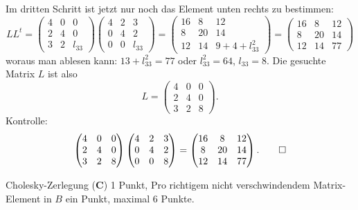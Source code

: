 \begin{loesung}
Im dritten Schritt ist jetzt nur noch das Element unten rechts zu bestimmen:
\[
LL^t=
\begin{pmatrix}
4&0&     0\\
2&4&     0\\
3&2&l_{33}
\end{pmatrix}
\begin{pmatrix}
4&2&     3\\
0&4&     2\\
0&0&l_{33}
\end{pmatrix}
=
\begin{pmatrix}
16& 8& 12\\
 8&20& 14\\
12&14&9+4+l_{33}^2
\end{pmatrix}
=
\begin{pmatrix}
16& 8& 12\\
 8&20& 14\\
12&14& 77
\end{pmatrix}
\]
woraus man ablesen kann: $13+l_{33}^2=77$ oder $l_{33}^2=64$, $l_{33}=8$.
Die gesuchte Matrix $L$ ist also
\[
L=
\begin{pmatrix}
4&0&0\\
2&4&0\\
3&2&8
\end{pmatrix}.
\]
Kontrolle:
\[
\begin{pmatrix}
4&0&0\\
2&4&0\\
3&2&8
\end{pmatrix}
\begin{pmatrix}
4&2&3\\
0&4&2\\
0&0&8
\end{pmatrix}
=
\begin{pmatrix}
16& 8& 12\\
 8&20& 14\\
12&14& 77
\end{pmatrix}.
\qedhere
\]
\end{loesung}

\begin{bewertung}
Cholesky-Zerlegung ({\bf C}) 1 Punkt,
Pro richtigem nicht verschwindendem Matrix-Element in $B$ ein Punkt,
maximal 6 Punkte.
\end{bewertung}

